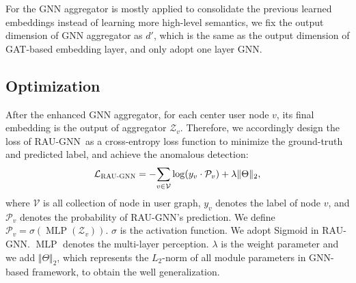 \documentclass[conference]{IEEEtran}
\theoremstyle{definition}
\newcommand{\model}{\textsc{RAU-GNN}}
\begin{document}
For the GNN aggregator is mostly applied to consolidate the previous learned embeddings instead of learning more high-level semantics, we fix the output dimension of GNN aggregator as $d'$, which is the same as the output dimension of GAT-based embedding layer, and only adopt one layer GNN. 


\subsection{Optimization}
After the enhanced GNN aggregator, for each center user node $v$, its final embedding is the output of aggregator $\mathcal{Z}_{v}$. Therefore, we accordingly design the loss of \model~as a cross-entropy loss function to minimize the ground-truth and predicted label, and achieve the anomalous detection:
\begin{equation}
\label{equ:loss}
    \mathcal{L}_{\operatorname{\model}} = -\underset{v\in\mathcal{V}}{\sum} \log (y_v \cdot \mathcal{P}_v) + \lambda \Vert \Theta \Vert_2,
\end{equation}
where $\mathcal{V}$ is all collection of node in user graph, $y_v$ denotes the label of node $v$, and $\mathcal{P}_v$ denotes the probability of \model's prediction. We define $\mathcal{P}_v = \sigma\left(\operatorname{MLP}(\mathcal{Z}_v)\right)$. $\sigma$ is the activation function. We adopt Sigmoid in \model. $\operatorname{MLP}$ denotes the multi-layer perception. $\lambda$ is the weight parameter and we add $\Vert \Theta \Vert_2$, which represents the $L_2$-norm of all module parameters in GNN-based framework, to obtain the well generalization.
\end{document}
